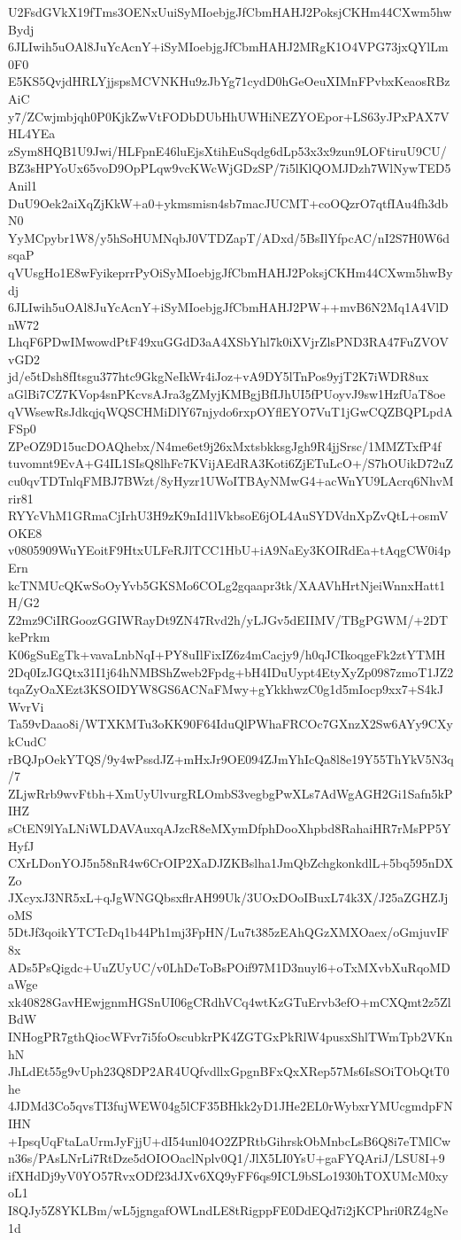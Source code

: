 U2FsdGVkX19fTms3OENxUuiSyMIoebjgJfCbmHAHJ2PoksjCKHm44CXwm5hwBydj
6JLIwih5uOAl8JuYcAcnY+iSyMIoebjgJfCbmHAHJ2MRgK1O4VPG73jxQYlLm0F0
E5KS5QvjdHRLYjjspsMCVNKHu9zJbYg71cydD0hGeOeuXIMnFPvbxKeaosRBzAiC
y7/ZCwjmbjqh0P0KjkZwVtFODbDUbHhUWHiNEZYOEpor+LS63yJPxPAX7VHL4YEa
zSym8HQB1U9Jwi/HLFpnE46luEjsXtihEuSqdg6dLp53x3x9zun9LOFtiruU9CU/
BZ3sHPYoUx65voD9OpPLqw9vcKWcWjGDzSP/7i5lKlQOMJDzh7WlNywTED5Anil1
DuU9Oek2aiXqZjKkW+a0+ykmsmisn4sb7macJUCMT+coOQzrO7qtfIAu4fh3dbN0
YyMCpybr1W8/y5hSoHUMNqbJ0VTDZapT/ADxd/5BsIlYfpcAC/nI2S7H0W6dsqaP
qVUsgHo1E8wFyikeprrPyOiSyMIoebjgJfCbmHAHJ2PoksjCKHm44CXwm5hwBydj
6JLIwih5uOAl8JuYcAcnY+iSyMIoebjgJfCbmHAHJ2PW++mvB6N2Mq1A4VlDnW72
LhqF6PDwIMwowdPtF49xuGGdD3aA4XSbYhl7k0iXVjrZlsPND3RA47FuZVOVvGD2
jd/e5tDsh8fItsgu377htc9GkgNeIkWr4iJoz+vA9DY5lTnPos9yjT2K7iWDR8ux
aGlBi7CZ7KVop4snPKcvsAJra3gZMyjKMBgjBfIJhUI5fPUoyvJ9sw1HzfUaT8oe
qVWsewRsJdkqjqWQSCHMiDlY67njydo6rxpOYflEYO7VuT1jGwCQZBQPLpdAFSp0
ZPeOZ9D15ucDOAQhebx/N4me6et9j26xMxtsbkksgJgh9R4jjSrsc/1MMZTxfP4f
tuvomnt9EvA+G4IL1SIsQ8lhFc7KVijAEdRA3Koti6ZjETuLcO+/S7hOUikD72uZ
cu0qvTDTnlqFMBJ7BWzt/8yHyzr1UWoITBAyNMwG4+acWnYU9LAcrq6NhvMrir81
RYYcVhM1GRmaCjIrhU3H9zK9nId1lVkbsoE6jOL4AuSYDVdnXpZvQtL+osmVOKE8
v0805909WuYEoitF9HtxULFeRJlTCC1HbU+iA9NaEy3KOIRdEa+tAqgCW0i4pErn
kcTNMUcQKwSoOyYvb5GKSMo6COLg2gqaapr3tk/XAAVhHrtNjeiWnnxHatt1H/G2
Z2mz9CiIRGoozGGIWRayDt9ZN47Rvd2h/yLJGv5dEIIMV/TBgPGWM/+2DTkePrkm
K06gSuEgTk+vavaLnbNqI+PY8uIlFixIZ6z4mCacjy9/h0qJCIkoqgeFk2ztYTMH
2Dq0IzJGQtx31I1j64hNMBShZweb2Fpdg+bH4IDuUypt4EtyXyZp0987zmoT1JZ2
tqaZyOaXEzt3KSOIDYW8GS6ACNaFMwy+gYkkhwzC0g1d5mIocp9xx7+S4kJWvrVi
Ta59vDaao8i/WTXKMTu3oKK90F64IduQlPWhaFRCOc7GXnzX2Sw6AYy9CXykCudC
rBQJpOekYTQS/9y4wPssdJZ+mHxJr9OE094ZJmYhIcQa8l8e19Y55ThYkV5N3q/7
ZLjwRrb9wvFtbh+XmUyUlvurgRLOmbS3vegbgPwXLs7AdWgAGH2Gi1Safn5kPIHZ
sCtEN9lYaLNiWLDAVAuxqAJzcR8eMXymDfphDooXhpbd8RahaiHR7rMsPP5YHyfJ
CXrLDonYOJ5n58nR4w6CrOIP2XaDJZKBslha1JmQbZchgkonkdlL+5bq595nDXZo
JXcyxJ3NR5xL+qJgWNGQbsxflrAH99Uk/3UOxDOoIBuxL74k3X/J25aZGHZJjoMS
5DtJf3qoikYTCTcDq1b44Ph1mj3FpHN/Lu7t385zEAhQGzXMXOaex/oGmjuvIF8x
ADs5PsQigdc+UuZUyUC/v0LhDeToBsPOif97M1D3nuyl6+oTxMXvbXuRqoMDaWge
xk40828GavHEwjgnmHGSnUI06gCRdhVCq4wtKzGTuErvb3efO+mCXQmt2z5ZlBdW
INHogPR7gthQiocWFvr7i5foOscubkrPK4ZGTGxPkRlW4pusxShlTWmTpb2VKnhN
JhLdEt55g9vUph23Q8DP2AR4UQfvdllxGpgnBFxQxXRep57Ms6IsSOiTObQtT0he
4JDMd3Co5qvsTI3fujWEW04g5lCF35BHkk2yD1JHe2EL0rWybxrYMUcgmdpFNIHN
+IpsqUqFtaLaUrmJyFjjU+dI54unl04O2ZPRtbGihrskObMnbcLsB6Q8i7eTMlCw
n36s/PAsLNrLi7RtDze5dOIOOaclNplv0Q1/JlX5LI0YsU+gaFYQAriJ/LSU8I+9
ifXHdDj9yV0YO57RvxODf23dJXv6XQ9yFF6qs9ICL9bSLo1930hTOXUMcM0xyoL1
I8QJy5Z8YKLBm/wL5jgngafOWLndLE8tRigppFE0DdEQd7i2jKCPhri0RZ4gNe1d
